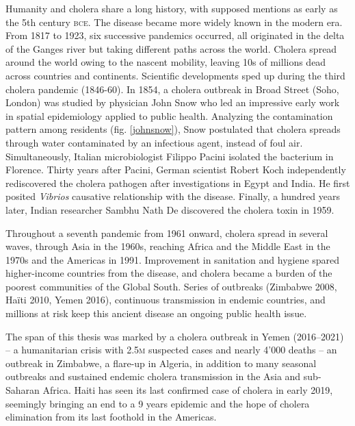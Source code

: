 Humanity and cholera share a long history, with supposed mentions as early as the 5th century \textsc{bce}. The disease became more widely known in the modern era. From 1817 to 1923, six successive pandemics occurred, all originated in the delta of the Ganges river but taking different paths across the world. Cholera spread around the world owing to the nascent mobility, leaving 10s of millions dead across countries and continents.  Scientific developments sped up during the third cholera pandemic (1846-60). In 1854, a cholera outbreak in Broad Street (Soho, London) was studied by physician John Snow who led an impressive early work in spatial epidemiology applied to public health. Analyzing the contamination pattern among residents (fig. \ref{johnsnow}), Snow postulated that cholera spreads through water contaminated by an infectious agent, instead of foul air.  Simultaneously, Italian microbiologist Filippo Pacini isolated the bacterium in Florence\cite{Pacini:OsservazioniMicroscopicheDeduzioni:1854}. Thirty years after Pacini, German scientist Robert Koch independently rediscovered the cholera pathogen after investigations in Egypt and India. He first posited \textit{Vibrios} causative relationship with the disease. Finally, a hundred years later, Indian researcher Sambhu Nath De discovered the cholera toxin in 1959\cite{De:ExperimentalStudyAction:1951}.

Throughout a seventh pandemic from 1961 onward, cholera spread in several waves, through Asia in the 1960s, reaching Africa and the Middle East in the 1970s and the Americas in 1991\cite{Mutreja:EvidenceSeveralWaves:2011}. Improvement in sanitation and hygiene spared higher-income countries from the disease, and cholera became a burden of the poorest communities of the Global South. Series of outbreaks (\eg Zimbabwe 2008, Haïti 2010, Yemen 2016), continuous transmission in endemic countries, and millions at risk keep this ancient disease an ongoing public health issue.

The span of this thesis was marked by a cholera outbreak in Yemen (2016--2021) -- a humanitarian crisis with 2.5\textsc{m} suspected cases and nearly 4'000 deaths -- an outbreak in Zimbabwe, a flare-up in Algeria, in addition to many seasonal outbreaks and sustained endemic cholera transmission in the Asia and sub-Saharan Africa. Haiti has seen its last confirmed case of cholera in early 2019, seemingly bringing an end to a 9 years epidemic and the hope of cholera elimination from its last foothold in the Americas. 

